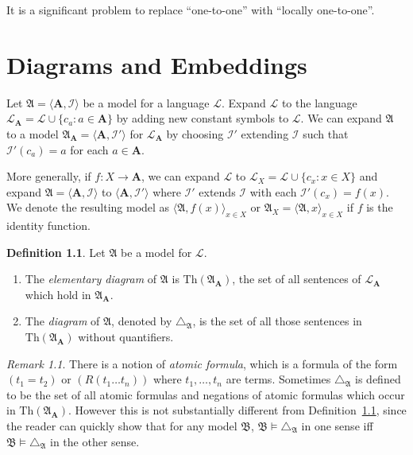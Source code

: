 \documentclass[titlepage, oneside]{amsbook}
\theoremstyle{plain}
\theoremstyle{definition}
\newtheorem{definition}{Definition}
\theoremstyle{remark}
\newtheorem*{rem}{Remark}
\newcommand{\Th}{\ensuremath{\mbox{Th}}}
\newcommand{\tria}[1]{\ensuremath{\triangle_{\mathfrak{#1}}}}
\newcommand{\lan}{\ensuremath{\mathcal{L}}}
\newcommand{\ma}{\ensuremath{\mathfrak{A}}}
\newcommand{\mb}{\ensuremath{\mathfrak{B}}}
\newcommand{\ba}{\ensuremath{\mathbf{A}}}
\begin{document}
It is a significant  problem to replace ``one-to-one'' with ``locally
one-to-one''.


\chapter{Diagrams and Embeddings}



Let $\ma = \langle \ba ,\mathcal I \rangle $ be a model for a
language $\lan$.  Expand $\lan$ to the language 
$\lan_\ba = \lan \cup \{ c_a : a \in \ba \}$ by adding new constant symbols to $\lan$. We can expand $\ma$ to a model 
$\ma_\ba = \langle \ba , \mathcal{I}' \rangle$ for $\lan_\ba$ by
choosing $\mathcal{I}'$ extending $\mathcal{I}$ such that
$\mathcal{I}'(c_a)=a$ for each $a \in \ba$. 


More generally, if $f \colon X \rightarrow \ba$, we can expand $\lan$ to 
$\lan_{X} = \lan \cup \{ c_x : x \in X \}$ and expand 
$\ma = \langle \ba ,\mathcal{I} \rangle $ to $\langle \ba ,\mathcal{I}' \rangle$ 
where $\mathcal{I}'$ extends $\mathcal{I}$ with each $\mathcal{I}' (c_x) = f(x)$. We denote the resulting model as $\langle \ma , f(x)\rangle _{x \in X}$ or 
$\ma_X = \langle \ma , x \rangle _{x \in X}$ if $f$ is the identity function.

\begin{definition}\label{D:diagram}
% 
%
Let $\ma$ be a model
for $\lan$. 
\begin{enumerate}
\item The \emph{elementary
diagram} of $\ma$ is $\Th(\ma_\ba)$, the set of all sentences of
$\lan_\ba$ which hold in $\ma_\ba$.  

\item The \emph{diagram} of $\ma$, denoted by $\tria{A}$, is the set of
all those sentences in $\Th(\ma_\ba)$ without quantifiers.
\end{enumerate}
\end{definition}


\begin{rem}  There is a notion of \emph{atomic formula}, which is a
formula of the form $(t_1 = t_2)$ or $(R(t_1 \dots t_n))$ where $t_1 ,
\dots , t_n$ are terms.  Sometimes $\tria A$ is defined to be the set
of all atomic formulas and negations of atomic formulas which occur in
$\Th (\ma_\ba)$.  However this is not substantially different from
Definition~\ref{D:diagram}, since the reader can quickly show that for
any model $\mb$, $\mb \models \tria A$ in one sense iff $\mb \models
\tria A$ in the other sense.

\end{rem}
\end{document}
